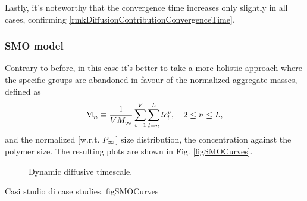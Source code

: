 \documentclass{article}
\begin{document}
                Lastly, it's noteworthy that the convergence time increases only slightly in all cases, confirming \ref{rmkDiffusionContributionConvergenceTime}.

            \subsubsection{SMO model}\label{secResultsSMO}

                Contrary to before, in this case it's better to take a more holistic approach\footnotemark{} where the specific groups are ab\-an\-do\-ned in favour of the normalized aggregate masses, defined as
                \begin{equation}
                    \text{M}_n\equiv\frac1{VM_\infty}\sum_{v=1}^V\sum_{l=n}^Llc_l^v,\quad2\le n\le L,
                    \label{eqAggregateMass}
                \end{equation}
                and the normalized [w.r.t. $P_\infty$] size distribution, \ie{} the concentration against the polymer size. The resulting plots are shown in Fig. \ref{figSMOCurves}.


                \begin{figure}[tb]
                    \centering
                    \resizebox{\linewidth}{!}{}
                    \caption{Dynamic diffusive timescale.}
                    \label{figDynamicDiffusiveTimeScales}
                \end{figure}


                    {}
                    {\selezionaLingua
                        {Casi studio di \SMOdiscrete{}}
                        {\SMOdiscrete{} case studies}.}
                    {\linewidth}
                    {figSMOCurves}

\end{document}
